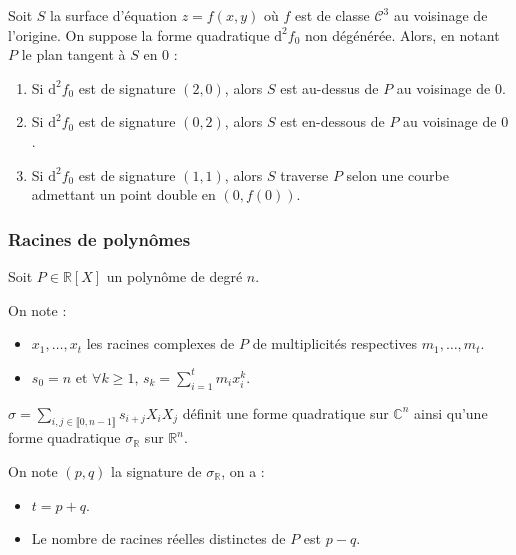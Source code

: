   \begin{application}
    Soit $S$ la surface d'équation $z = f(x, y)$ où $f$ est de classe $\mathcal{C}^3$ au voisinage de l'origine. On suppose la forme quadratique $\mathrm{d}^2 f_0$ non dégénérée. Alors, en notant $P$ le plan tangent à $S$ en $0$ :
    \begin{enumerate}[label={\bfseries(\roman*)}]
      \item Si $\mathrm{d}^2 f_0$ est de signature $(2, 0)$, alors $S$ est au-dessus de $P$ au voisinage de $0$.
      \item Si $\mathrm{d}^2 f_0$ est de signature $(0, 2)$, alors $S$ est en-dessous de $P$ au voisinage de $0$.
      \item Si $\mathrm{d}^2 f_0$ est de signature $(1, 1)$, alors $S$ traverse $P$ selon une courbe admettant un point double en $(0, f(0))$.
    \end{enumerate}
  \end{application}

  \subsubsection{Racines de polynômes}


  Soit $P \in \mathbb{R}[X]$ un polynôme de degré $n$.

  \begin{notation}
    On note :
    \begin{itemize}
      \item $x_1, \dots, x_t$ les racines complexes de $P$ de multiplicités respectives $m_1, \dots, m_t$.
      \item $s_0 = n \text{ et } \forall k \geq 1, \, s_k = \sum_{i=1}^t m_i x_i^k$.
    \end{itemize}
  \end{notation}

  \begin{proposition}
    $\sigma = \sum_{i, j \in \llbracket 0, n-1 \rrbracket} s_{i+j} X_i X_j$ définit une forme quadratique sur $\mathbb{C}^n$ ainsi qu'une forme quadratique $\sigma_{\mathbb{R}}$ sur $\mathbb{R}^n$.
  \end{proposition}


  \begin{theorem}
    On note $(p,q)$ la signature de $\sigma_{\mathbb{R}}$, on a :
    \begin{itemize}
      \item $t = p + q$.
      \item Le nombre de racines réelles distinctes de $P$ est $p-q$.
    \end{itemize}
  \end{theorem}

